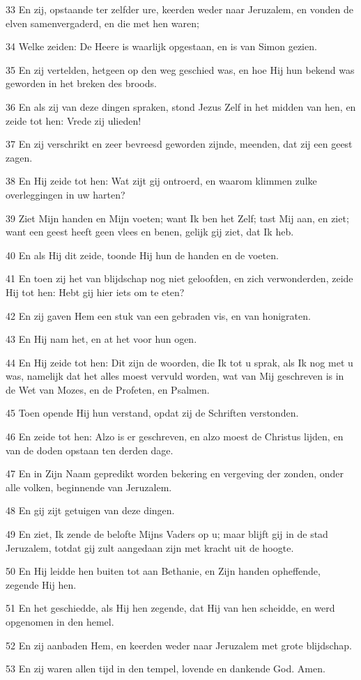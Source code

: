 \par 33 En zij, opstaande ter zelfder ure, keerden weder naar Jeruzalem, en vonden de elven samenvergaderd, en die met hen waren;
\par 34 Welke zeiden: De Heere is waarlijk opgestaan, en is van Simon gezien.
\par 35 En zij vertelden, hetgeen op den weg geschied was, en hoe Hij hun bekend was geworden in het breken des broods.
\par 36 En als zij van deze dingen spraken, stond Jezus Zelf in het midden van hen, en zeide tot hen: Vrede zij ulieden!
\par 37 En zij verschrikt en zeer bevreesd geworden zijnde, meenden, dat zij een geest zagen.
\par 38 En Hij zeide tot hen: Wat zijt gij ontroerd, en waarom klimmen zulke overleggingen in uw harten?
\par 39 Ziet Mijn handen en Mijn voeten; want Ik ben het Zelf; tast Mij aan, en ziet; want een geest heeft geen vlees en benen, gelijk gij ziet, dat Ik heb.
\par 40 En als Hij dit zeide, toonde Hij hun de handen en de voeten.
\par 41 En toen zij het van blijdschap nog niet geloofden, en zich verwonderden, zeide Hij tot hen: Hebt gij hier iets om te eten?
\par 42 En zij gaven Hem een stuk van een gebraden vis, en van honigraten.
\par 43 En Hij nam het, en at het voor hun ogen.
\par 44 En Hij zeide tot hen: Dit zijn de woorden, die Ik tot u sprak, als Ik nog met u was, namelijk dat het alles moest vervuld worden, wat van Mij geschreven is in de Wet van Mozes, en de Profeten, en Psalmen.
\par 45 Toen opende Hij hun verstand, opdat zij de Schriften verstonden.
\par 46 En zeide tot hen: Alzo is er geschreven, en alzo moest de Christus lijden, en van de doden opstaan ten derden dage.
\par 47 En in Zijn Naam gepredikt worden bekering en vergeving der zonden, onder alle volken, beginnende van Jeruzalem.
\par 48 En gij zijt getuigen van deze dingen.
\par 49 En ziet, Ik zende de belofte Mijns Vaders op u; maar blijft gij in de stad Jeruzalem, totdat gij zult aangedaan zijn met kracht uit de hoogte.
\par 50 En Hij leidde hen buiten tot aan Bethanie, en Zijn handen opheffende, zegende Hij hen.
\par 51 En het geschiedde, als Hij hen zegende, dat Hij van hen scheidde, en werd opgenomen in den hemel.
\par 52 En zij aanbaden Hem, en keerden weder naar Jeruzalem met grote blijdschap.
\par 53 En zij waren allen tijd in den tempel, lovende en dankende God. Amen.




